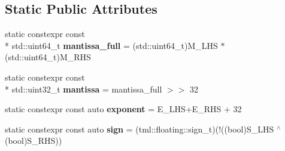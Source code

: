 \subsection*{Static Public Attributes}
\begin{DoxyCompactItemize}
\item 
\hypertarget{structtml_1_1mul_3_01tml_1_1floating_1_1number_3_01_s___l_h_s_00_01_e___l_h_s_00_01_m___l_h_s_01ac138e7545479133819191251e8549d2_a1bc81a9d2c3654ee6aea043aa54cfee1}{static constexpr const \\*
std\+::uint64\+\_\+t {\bfseries mantissa\+\_\+full} = (std\+::uint64\+\_\+t)M\+\_\+\+L\+H\+S $\ast$ (std\+::uint64\+\_\+t)M\+\_\+\+R\+H\+S}\label{structtml_1_1mul_3_01tml_1_1floating_1_1number_3_01_s___l_h_s_00_01_e___l_h_s_00_01_m___l_h_s_01ac138e7545479133819191251e8549d2_a1bc81a9d2c3654ee6aea043aa54cfee1}

\item 
\hypertarget{structtml_1_1mul_3_01tml_1_1floating_1_1number_3_01_s___l_h_s_00_01_e___l_h_s_00_01_m___l_h_s_01ac138e7545479133819191251e8549d2_a0741aba21a96d0fe85de62247af94f7a}{static constexpr const \\*
std\+::uint32\+\_\+t {\bfseries mantissa} = mantissa\+\_\+full $>$$>$ 32}\label{structtml_1_1mul_3_01tml_1_1floating_1_1number_3_01_s___l_h_s_00_01_e___l_h_s_00_01_m___l_h_s_01ac138e7545479133819191251e8549d2_a0741aba21a96d0fe85de62247af94f7a}

\item 
\hypertarget{structtml_1_1mul_3_01tml_1_1floating_1_1number_3_01_s___l_h_s_00_01_e___l_h_s_00_01_m___l_h_s_01ac138e7545479133819191251e8549d2_a7dec9adba1eaf3f9d6a5a819b855bac3}{static constexpr const auto {\bfseries exponent} = E\+\_\+\+L\+H\+S+E\+\_\+\+R\+H\+S + 32}\label{structtml_1_1mul_3_01tml_1_1floating_1_1number_3_01_s___l_h_s_00_01_e___l_h_s_00_01_m___l_h_s_01ac138e7545479133819191251e8549d2_a7dec9adba1eaf3f9d6a5a819b855bac3}

\item 
\hypertarget{structtml_1_1mul_3_01tml_1_1floating_1_1number_3_01_s___l_h_s_00_01_e___l_h_s_00_01_m___l_h_s_01ac138e7545479133819191251e8549d2_af4ad1eee5825988ec83550957eaf5c8a}{static constexpr const auto {\bfseries sign} = (tml\+::floating\+::sign\+\_\+t)(!((bool)S\+\_\+\+L\+H\+S $^\wedge$ (bool)S\+\_\+\+R\+H\+S))}\label{structtml_1_1mul_3_01tml_1_1floating_1_1number_3_01_s___l_h_s_00_01_e___l_h_s_00_01_m___l_h_s_01ac138e7545479133819191251e8549d2_af4ad1eee5825988ec83550957eaf5c8a}

\end{DoxyCompactItemize}


